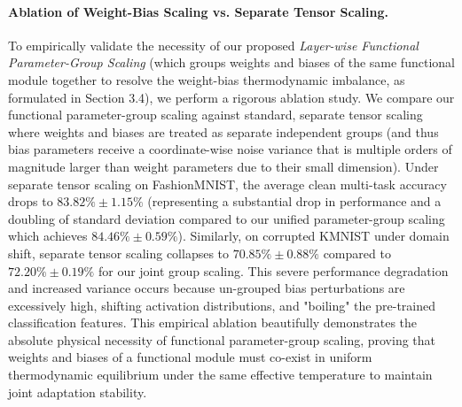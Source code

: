 \paragraph{Ablation of Weight-Bias Scaling vs. Separate Tensor Scaling.} To empirically validate the necessity of our proposed \emph{Layer-wise Functional Parameter-Group Scaling} (which groups weights and biases of the same functional module together to resolve the weight-bias thermodynamic imbalance, as formulated in Section 3.4), we perform a rigorous ablation study.
We compare our functional parameter-group scaling against standard, separate tensor scaling where weights and biases are treated as separate independent groups (and thus bias parameters receive a coordinate-wise noise variance that is multiple orders of magnitude larger than weight parameters due to their small dimension).
Under separate tensor scaling on FashionMNIST, the average clean multi-task accuracy drops to $83.82\% \pm 1.15\%$ (representing a substantial drop in performance and a doubling of standard deviation compared to our unified parameter-group scaling which achieves $84.46\% \pm 0.59\%$).
Similarly, on corrupted KMNIST under domain shift, separate tensor scaling collapses to $70.85\% \pm 0.88\%$ compared to $72.20\% \pm 0.19\%$ for our joint group scaling.
This severe performance degradation and increased variance occurs because un-grouped bias perturbations are excessively high, shifting activation distributions, and "boiling" the pre-trained classification features.
This empirical ablation beautifully demonstrates the absolute physical necessity of functional parameter-group scaling, proving that weights and biases of a functional module must co-exist in uniform thermodynamic equilibrium under the same effective temperature to maintain joint adaptation stability.

